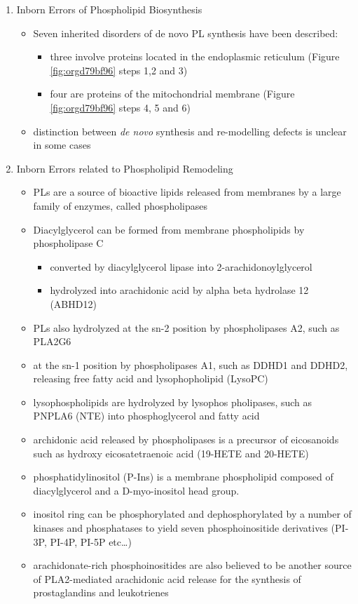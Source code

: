 \documentclass{scrartcl}
\begin{document}
\begin{enumerate}
\item Inborn Errors of Phospholipid Biosynthesis
\label{sec:orgbf63088}
\begin{itemize}
\item Seven inherited disorders of de novo PL synthesis have been described:
\begin{itemize}
\item three involve proteins located in the endoplasmic reticulum
(Figure \ref{fig:orgd79bf96} steps 1,2 and 3)
\item four are proteins of the mitochondrial membrane (Figure
\ref{fig:orgd79bf96} steps 4, 5 and 6)
\end{itemize}
\item distinction between \emph{de novo} synthesis and re-modelling defects is
unclear in some cases
\end{itemize}

\item Inborn Errors related to Phospholipid Remodeling
\label{sec:org0bbbb47}
\begin{itemize}
\item PLs are a source of bioactive lipids released from
membranes by a large family of enzymes, called phospholipases
\item Diacylglycerol can be formed from membrane phospholipids by
phospholipase C
\begin{itemize}
\item converted by diacylglycerol lipase into 2-arachidonoylglycerol
\item hydrolyzed into arachidonic acid by alpha beta hydrolase 12 (ABHD12)
\end{itemize}
\item PLs also hydrolyzed at the sn-2 position by phospholipases A2, such
as PLA2G6
\item at the sn-1 position by phospholipases A1, such as DDHD1 and DDHD2,
releasing free fatty acid and lysophopholipid
(LysoPC)
\item lysophospholipids are hydrolyzed by lysophos pholipases, such as
PNPLA6 (NTE) into phosphoglycerol and fatty acid
\item archidonic acid released by phospholipases is a precursor of eicosanoids such as
hydroxy eicosatetraenoic acid (19-HETE and 20-HETE)
\item phosphatidylinositol (P-Ins) is a membrane phospholipid composed of
diacylglycerol and a D-myo-inositol head group.
\item inositol ring can be phosphorylated and dephosphorylated by a number
of kinases and phosphatases to yield seven phosphoinositide
derivatives (PI-3P, PI-4P, PI-5P etc\ldots{})
\item arachidonate-rich phosphoinositides are also believed to be another
source of PLA2-mediated arachidonic acid release for the synthesis
of prostaglandins and leukotrienes
\end{itemize}
\end{enumerate}
\end{document}
